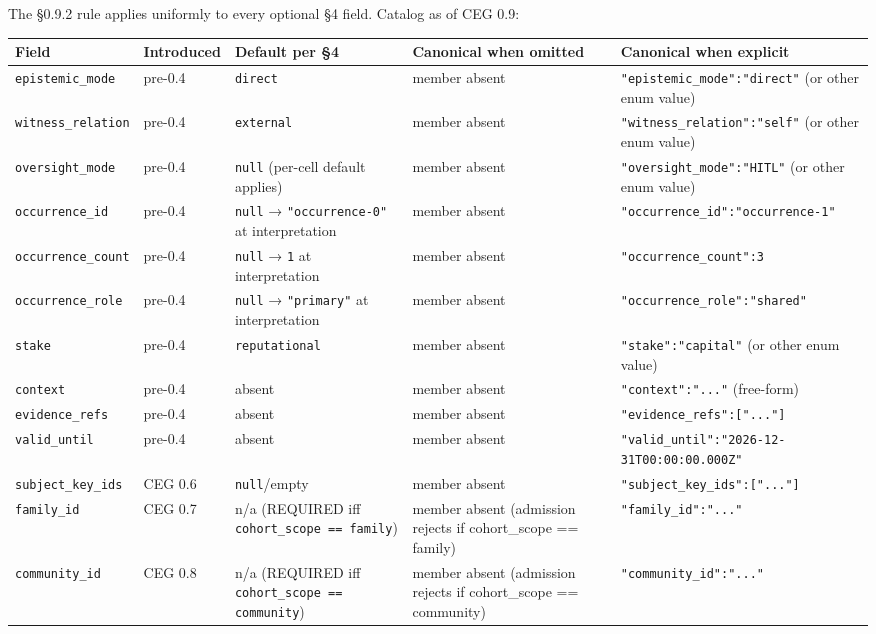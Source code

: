 \documentclass[11pt]{article}
\begin{document}
The §0.9.2 rule applies uniformly to every optional §4 field. Catalog as of CEG 0.9:


{\scriptsize
\begin{longtable}{|p{3.2cm}|p{3.2cm}|p{3.2cm}|p{3.2cm}|p{3.2cm}|}\hline
\textbf{Field} & \textbf{Introduced} & \textbf{Default per §4} & \textbf{Canonical when omitted} & \textbf{Canonical when explicit} \\ \hline\endhead
\texttt{epistemic\_mode} & pre-0.4 & \texttt{direct} & member absent & \texttt{"epistemic\_mode":"direct"} (or other enum value) \\ \hline
\texttt{witness\_relation} & pre-0.4 & \texttt{external} & member absent & \texttt{"witness\_relation":"self"} (or other enum value) \\ \hline
\texttt{oversight\_mode} & pre-0.4 & \texttt{null} (per-cell default applies) & member absent & \texttt{"oversight\_mode":"HITL"} (or other enum value) \\ \hline
\texttt{occurrence\_id} & pre-0.4 & \texttt{null} → \texttt{"occurrence-0"} at interpretation & member absent & \texttt{"occurrence\_id":"occurrence-1"} \\ \hline
\texttt{occurrence\_count} & pre-0.4 & \texttt{null} → \texttt{1} at interpretation & member absent & \texttt{"occurrence\_count":3} \\ \hline
\texttt{occurrence\_role} & pre-0.4 & \texttt{null} → \texttt{"primary"} at interpretation & member absent & \texttt{"occurrence\_role":"shared"} \\ \hline
\texttt{stake} & pre-0.4 & \texttt{reputational} & member absent & \texttt{"stake":"capital"} (or other enum value) \\ \hline
\texttt{context} & pre-0.4 & absent & member absent & \texttt{"context":"..."} (free-form) \\ \hline
\texttt{evidence\_refs} & pre-0.4 & absent & member absent & \texttt{"evidence\_refs":["..."]} \\ \hline
\texttt{valid\_until} & pre-0.4 & absent & member absent & \texttt{"valid\_until":"2026-12-31T00:00:00.000Z"} \\ \hline
\texttt{subject\_key\_ids} & CEG 0.6 & \texttt{null}/empty & member absent & \texttt{"subject\_key\_ids":["..."]} \\ \hline
\texttt{family\_id} & CEG 0.7 & n/a (REQUIRED iff \texttt{cohort\_scope == family}) & member absent (admission rejects if cohort\_scope == family) & \texttt{"family\_id":"..."} \\ \hline
\texttt{community\_id} & CEG 0.8 & n/a (REQUIRED iff \texttt{cohort\_scope == community}) & member absent (admission rejects if cohort\_scope == community) & \texttt{"community\_id":"..."} \\ \hline

\end{longtable}}
\end{document}
